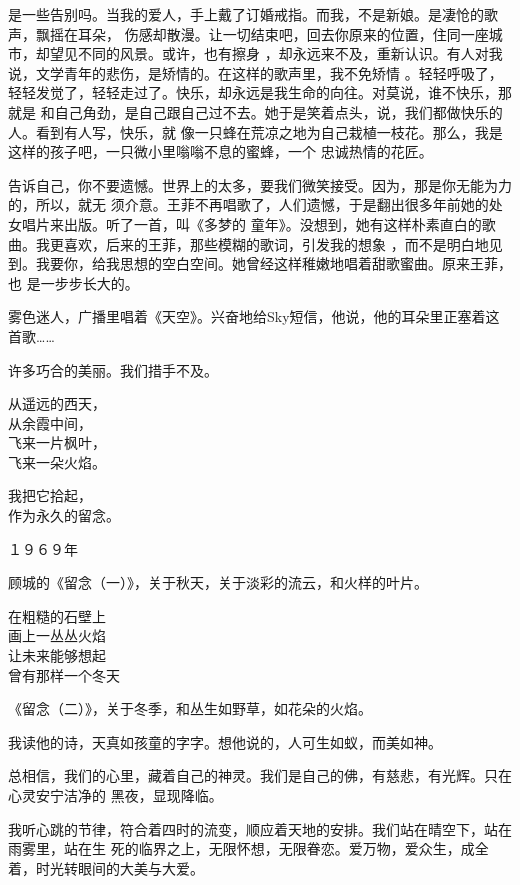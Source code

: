 \documentclass[12pt,a4paper]{article}
\begin{document}
		是一些告别吗。当我的爱人，手上戴了订婚戒指。而我，不是新娘。是凄怆的歌声，飘摇在耳朵，
	伤感却散漫。让一切结束吧，回去你原来的位置，住同一座城市，却望见不同的风景。或许，也有擦身
	，却永远来不及，重新认识。有人对我说，文学青年的悲伤，是矫情的。在这样的歌声里，我不免矫情
	。轻轻呼吸了，轻轻发觉了，轻轻走过了。快乐，却永远是我生命的向往。对莫说，谁不快乐，那就是
	和自己角劲，是自己跟自己过不去。她于是笑着点头，说，我们都做快乐的人。看到有人写，快乐，就
	像一只蜂在荒凉之地为自己栽植一枝花。那么，我是这样的孩子吧，一只微小里嗡嗡不息的蜜蜂，一个
	忠诚热情的花匠。


		告诉自己，你不要遗憾。世界上的太多，要我们微笑接受。因为，那是你无能为力的，所以，就无
	须介意。王菲不再唱歌了，人们遗憾，于是翻出很多年前她的处女唱片来出版。听了一首，叫《多梦的
	童年》。没想到，她有这样朴素直白的歌曲。我更喜欢，后来的王菲，那些模糊的歌词，引发我的想象
	，而不是明白地见到。我要你，给我思想的空白空间。她曾经这样稚嫩地唱着甜歌蜜曲。原来王菲，也
	是一步步长大的。


		雾色迷人，广播里唱着《天空》。兴奋地给Sky短信，他说，他的耳朵里正塞着这首歌……

		许多巧合的美丽。我们措手不及。

	\endwriting



		\longpoem{}{}{}
		从遥远的西天，\\
		从余霞中间，\\
		飞来一片枫叶，\\
		飞来一朵火焰。

		我把它拾起，\\
		作为永久的留念。

		\flushright １９６９年
		\endlongpoem

		顾城的《留念（一）》，关于秋天，关于淡彩的流云，和火样的叶片。

		\longpoem{}{}{}
		在粗糙的石壁上 \\
		画上一丛丛火焰 \\
		让未来能够想起 \\
		曾有那样一个冬天
		\endlongpoem

		《留念（二）》，关于冬季，和丛生如野草，如花朵的火焰。

		我读他的诗，天真如孩童的字字。想他说的，人可生如蚁，而美如神。

		总相信，我们的心里，藏着自己的神灵。我们是自己的佛，有慈悲，有光辉。只在心灵安宁洁净的
	黑夜，显现降临。

		我听心跳的节律，符合着四时的流变，顺应着天地的安排。我们站在晴空下，站在雨雾里，站在生
	死的临界之上，无限怀想，无限眷恋。爱万物，爱众生，成全着，时光转眼间的大美与大爱。
\end{document}
